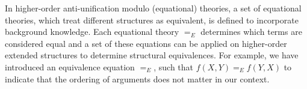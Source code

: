 %
%

In higher-order anti-unification modulo (equational) theories, a set of equational theories, which treat different structures as equivalent, is defined to incorporate background knowledge. Each equational theory $=_E$ determines which terms are considered equal and a set of these equations can be applied on higher-order extended structures to determine structural equivalences. For example, we have introduced an equivalence equation $=_E$, such that $f(X,Y) =_E f(Y,X)$ to indicate that the ordering of arguments does not matter in our context.

